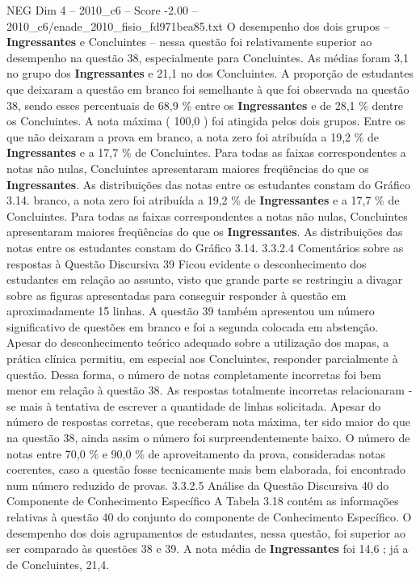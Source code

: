 \begin{textsample}{NEG Dim 4 – 2010\_c6 – Score -2.00 – 2010\_c6/enade\_2010\_fisio\_fd971bea85.txt}
O desempenho dos dois grupos – \textbf{Ingressantes} e Concluintes – nessa questão foi relativamente superior ao desempenho na questão 38, especialmente para Concluintes.
As médias foram 3,1 no grupo dos \textbf{Ingressantes} e 21,1 no dos Concluintes.
A proporção de estudantes que deixaram a questão em branco foi semelhante à que foi observada na questão 38, sendo esses percentuais de 68,9 \% entre os \textbf{Ingressantes} e de 28,1 \% dentre os Concluintes.
A nota máxima ( 100,0 ) foi atingida pelos dois grupos.
Entre os que não deixaram a prova em branco, a nota zero foi atribuída a 19,2 \% de \textbf{Ingressantes} e a 17,7 \% de Concluintes.
Para todas as faixas correspondentes a notas não nulas, Concluintes apresentaram maiores freqüências do que os \textbf{Ingressantes}.
As distribuições das notas entre os estudantes constam do Gráfico 3.14. branco, a nota zero foi atribuída a 19,2 \% de \textbf{Ingressantes} e a 17,7 \% de Concluintes.
Para todas as faixas correspondentes a notas não nulas, Concluintes apresentaram maiores freqüências do que os \textbf{Ingressantes}.
As distribuições das notas entre os estudantes constam do Gráfico 3.14. 3.3.2.4 Comentários sobre as respostas à Questão Discursiva 39 Ficou evidente o desconhecimento dos estudantes em relação ao assunto, visto que grande parte se restringiu a divagar sobre as figuras apresentadas para conseguir responder à questão em aproximadamente 15 linhas.
A questão 39 também apresentou um número significativo de questões em branco e foi a segunda colocada em abstenção.
Apesar do desconhecimento teórico adequado sobre a utilização dos mapas, a prática clínica permitiu, em especial aos Concluintes, responder parcialmente à questão.
Dessa forma, o número de notas completamente incorretas foi bem menor em relação à questão 38.
As respostas totalmente incorretas relacionaram -se mais à tentativa de escrever a quantidade de linhas solicitada.
Apesar do número de respostas corretas, que receberam nota máxima, ter sido maior do que na questão 38, ainda assim o número foi surpreendentemente baixo.
O número de notas entre 70,0 \% e 90,0 \% de aproveitamento da prova, consideradas notas coerentes, caso a questão fosse tecnicamente mais bem elaborada, foi encontrado num número reduzido de provas. 3.3.2.5 Análise da Questão Discursiva 40 do Componente de Conhecimento Específico A Tabela 3.18 contém as informações relativas à questão 40 do conjunto do componente de Conhecimento Específico.
O desempenho dos dois agrupamentos de estudantes, nessa questão, foi superior ao ser comparado às questões 38 e 39.
A nota média de \textbf{Ingressantes} foi 14,6 ; já a de Concluintes, 21,4.

\end{textsample}
